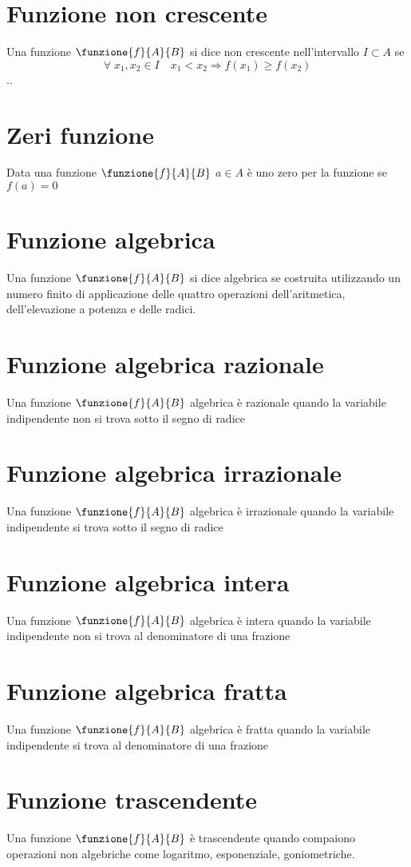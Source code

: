 \section{Funzione non crescente}
Una funzione $\funzione{f}{A}{B}$ si dice non crescente nell'intervallo  $I\subset A$ se
\begin{equation}
\forall\; x_1,x_2\in I\quad x_1< x_2\Longrightarrow f(x_1)\geq f(x_2)
\end{equation}
..\section{Zeri funzione}
Data una funzione $\funzione{f}{A}{B}$ $a\in A$ è uno zero per la funzione se $f(a)=0$
\section{Funzione algebrica}
Una funzione $\funzione{f}{A}{B}$ si dice algebrica se costruita utilizzando un numero finito di applicazione delle quattro operazioni dell'aritmetica, dell'elevazione a potenza e delle radici. 
\section{Funzione algebrica razionale}
Una funzione $\funzione{f}{A}{B}$ algebrica è razionale quando la variabile indipendente non si trova sotto il segno di radice \section{Funzione algebrica irrazionale}
Una funzione $\funzione{f}{A}{B}$ algebrica è irrazionale quando la variabile indipendente  si trova sotto il segno di radice 
\section{Funzione algebrica intera}
Una funzione $\funzione{f}{A}{B}$ algebrica è intera quando la variabile indipendente non si trova al denominatore di una frazione
\section{Funzione algebrica fratta}
Una funzione $\funzione{f}{A}{B}$ algebrica è fratta quando la variabile indipendente si trova al denominatore di una frazione	\section{Funzione trascendente}
	Una funzione $\funzione{f}{A}{B}$  è trascendente quando compaiono operazioni non algebriche come logaritmo, esponenziale, goniometriche.

